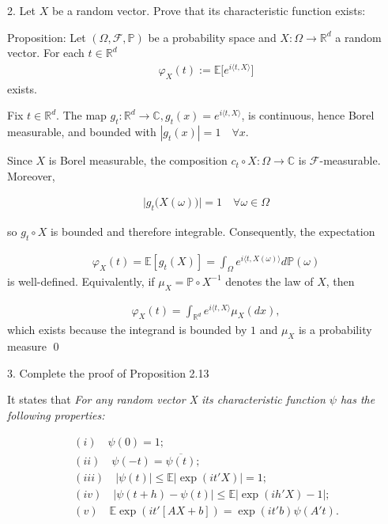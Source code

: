 \documentclass[10pt]{article}
\begin{document}
2. Let $X$ be a random vector. Prove that its characteristic function exists:

Proposition: Let $(\Omega, \mathcal{F}, \mathbb{P})$ be a probability space and $X : \Omega \to \mathbb{R}^{d}$ a random vector. For each $t \in \mathbb{R}^{d}$
\begin{gather*}
    \varphi_X(t) := \mathbb{E}\big[e^{i\langle t, X\rangle}\big]
\end{gather*}
exists.

Fix $t \in \mathbb{R}^{d}$. The map $g_{t} : \mathbb{R}^{d}\to \mathbb{C}, g_{t}(x) = e^{i\langle t, X\rangle}$, is continuous, hence Borel 
measurable, and bounded with $|g_t(x)| = 1 \quad\forall x$.

Since $X$ is Borel measurable, the composition $c_t\circ X : \Omega \to \mathbb{C}$ is $\mathcal{F}$-measurable. Moreover,

\begin{gather*}
    \Big|g_t\big(X(\omega)\big)\Big| = 1 \quad\forall \omega \in \Omega
\end{gather*}

so $g_t \circ X$ is bounded and therefore integrable. Consequently, the expectation

\begin{gather*}
    \varphi_X(t) = \mathbb{E}[g_t(X)] = \int_\Omega e^{i\langle t, X(\omega)\rangle} d \mathbb{P}(\omega)
\end{gather*}
is well-defined. Equivalently, if $\mu_X = \mathbb{P} \circ X^{-1}$ denotes the law of $X$, then

\begin{gather*}
    \varphi_X(t) = \int_{\mathbb{R}^{d}}e^{i\langle t, X\rangle}\mu_X(dx),
\end{gather*}
which exists because the integrand is bounded by $1$ and $\mu_X$ is a probability measure \qed

\newpage

3. Complete the proof of Proposition 2.13

It states that \textit{For any random vector X its characteristic function $\psi$ has the following properties:}

\begin{gather*}
    (i)\quad \psi(0) = 1; \\
    (ii)\quad \psi(-t) = \overline{\psi(t)};\\
    (iii)\quad |\psi(t)| \leq \mathbb{E}|\exp (it'X)| = 1;\\
    (iv)\quad |\psi(t + h) - \psi(t)| \leq \mathbb{E}| \exp (ih'X) - 1|;\\
    (v)\quad \mathbb{E}\exp (it'[AX + b]) = \exp (it'b)\psi(A't).
\end{gather*}
\end{document}
